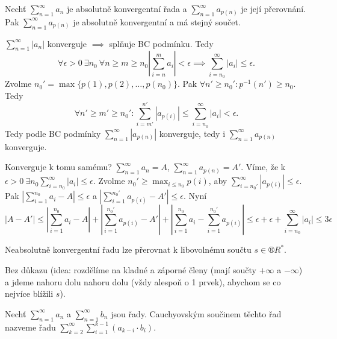 \documentclass[12pt]{article}                   %
\begin{document}
        \begin{veta}
            Nechť $\sum_{n=1}^∞ a_n$ je absolutně konvergentní řada a $\sum_{n=1}^∞ a_{p(n)}$ je její přerovnání. Pak $\sum_{n=1}^∞ a_{p(n)}$ je absolutně konvergentní a má stejný součet.

            \begin{dukazin}
                $\sum_{n=1}^∞ |a_n|$ konverguje $\implies$ splňuje BC podmínku. Tedy 
                $$ \forall \epsilon > 0\ \exists n_0\ \forall n ≥ m ≥ n_0 |\sum_{i=n}^m a_i| < \epsilon \implies \sum_{i=n_0}^∞ |a_i| ≤ \epsilon. $$
                Zvolme $n_0' = \max\{p(1), p(2), …, p(n_0)\}$. Pak $\forall n'≥ n_0': p^{-1}(n') ≥ n_0$. Tedy
                $$ \forall n' ≥ m' ≥ n_0': \sum_{i=m'}^{n'} |a_{p(i)}| ≤ \sum_{i=n_0}^∞ |a_i| < \epsilon. $$
                Tedy podle BC podmínky $\sum_{n=1}^∞ |a_{p(n)}|$ konverguje, tedy i $\sum_{n=1}^∞ a_{p(n)}$ konverguje.

                Konverguje k tomu samému? $\sum_{n=1}^∞ a_n = A$, $\sum_{n=1}^∞ a_{p(n)} = A'$. Víme, že k $\epsilon > 0\ \exists n_0 \sum_{i=n_0}^∞ |a_i| ≤ \epsilon$. Zvolme $n_0' ≥ \max_{i ≤ n_0} p(i)$, aby $\sum_{i=n_0'}^∞ |a_{p(i)}| ≤ \epsilon$. Pak $|\sum_{i=1}^{n_0} a_i - A| ≤ \epsilon$ a $|\sum_{i=1}^{n_0'} a_{p(i)} - A'| ≤ \epsilon$. Nyní
                $$ |A - A'| ≤ |\sum_{i=1}^{n_0} a_i - A| + |\sum_{i=1}^{n_0'} a_{p(i)} - A'| + |\sum_{i=1}^{n_0} a_i - \sum_{i=1}^{n_0'} a_{p(i)}| ≤ \epsilon + \epsilon + \sum_{i=n_0}^∞ |a_i| ≤ 3\epsilon $$ 
            \end{dukazin}
        \end{veta}


        \begin{veta}[Rieman]
            Neabsolutně konvergentní řadu lze přerovnat k libovolnému součtu $s \in ®R^*$.

            \begin{dukazin}
                Bez důkazu (idea: rozdělíme na kladné a záporné členy (mají součty $+∞$ a $-∞$) a jdeme nahoru dolu nahoru dolu (vždy alespoň o 1 prvek), abychom se co nejvíce blížili $s$).
            \end{dukazin}
        \end{veta}

        \begin{definice}
            Nechť $\sum_{n=1}^∞ a_n$ a $\sum_{n=1}^∞ b_n$ jsou řady. Cauchyovským součinem těchto řad nazveme řadu $\sum_{k=2}^∞ \sum_{i=1}^{k-1} (a_{k-i}·b_i)$.
        \end{definice}
\end{document}
